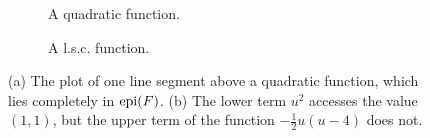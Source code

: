 \documentclass{scrreprt}
\begin{document}
        \begin{figure}[!ht]
            \centering
            \begin{subfigure}[b]{0.4\textwidth}
            \caption{A quadratic function.}
            \end{subfigure}
            \begin{subfigure}[b]{0.4\textwidth}
            \caption{A l.s.c. function.}
            \end{subfigure}
            \caption[Example of convex and l.s.c. function.]{(a) The plot of one line segment above a quadratic function, which lies completely in $\textnormal{epi}(F)$. (b) The lower term $u^{2}$ accesses the value $(1,1)$, but the upper term of the function $-\frac{1}{2}u(u-4)$ does not.}
            \label{fig:convex_function}
        \end{figure}
\end{document}

